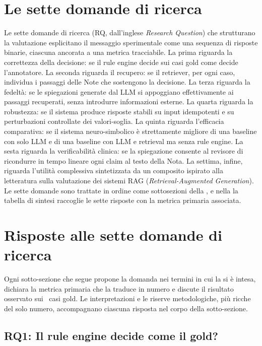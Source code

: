 \section{Le sette domande di ricerca}
\label{sec:rq}

Le sette domande di ricerca (RQ, dall'inglese \emph{Research Question}) che strutturano la valutazione esplicitano il messaggio sperimentale come una sequenza di risposte binarie, ciascuna ancorata a una metrica tracciabile. La prima riguarda la correttezza della decisione: se il rule engine decide sui casi gold come decide l'annotatore. La seconda riguarda il recupero: se il retriever, per ogni caso, individua i passaggi delle Note che sostengono la decisione. La terza riguarda la fedeltà: se le spiegazioni generate dal LLM si appoggiano effettivamente ai passaggi recuperati, senza introdurre informazioni esterne. La quarta riguarda la robustezza: se il sistema produce risposte stabili su input idempotenti e su perturbazioni controllate dei valori-soglia. La quinta riguarda l'efficacia comparativa: se il sistema neuro-simbolico è strettamente migliore di una baseline con solo LLM e di una baseline con LLM e retrieval ma senza rule engine. La sesta riguarda la verificabilità clinica: se la spiegazione consente al revisore di ricondurre in tempo lineare ogni claim al testo della Nota. La settima, infine, riguarda l'utilità complessiva sintetizzata da un composito ispirato alla letteratura sulla valutazione dei sistemi RAG (\emph{Retrieval-Augmented Generation}). Le sette domande sono trattate in ordine come sottosezioni della , e nella  la tabella di sintesi raccoglie le sette risposte con la metrica primaria associata.

\section{Risposte alle sette domande di ricerca}
\label{sec:risposte}

Ogni sotto-sezione che segue propone la domanda nei termini in cui la si è intesa, dichiara la metrica primaria che la traduce in numero e discute il risultato osservato sui \goldn\ casi gold. Le interpretazioni e le riserve metodologiche, più ricche del solo numero, accompagnano ciascuna risposta nel corpo della sotto-sezione.

\subsection{RQ1: Il rule engine decide come il gold?}
\label{sec:rq1}

